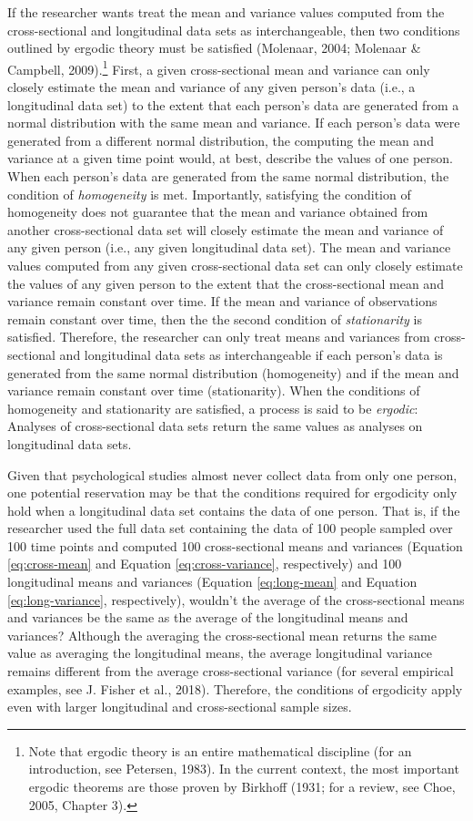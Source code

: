 \documentclass[
12pt, %
twoside,
english]{guelphthesis}
\theoremstyle{definition}
\theoremstyle{definition}
\theoremstyle{definition}
\theoremstyle{definition}
\theoremstyle{remark}
\begin{document}
If the researcher wants treat the mean and variance values computed from the cross-sectional and longitudinal data sets as interchangeable, then two conditions outlined by ergodic theory must be satisfied (Molenaar, 2004; Molenaar \& Campbell, 2009).\footnote{Note that ergodic theory is an entire mathematical discipline (for an introduction, see Petersen, 1983). In the current context, the most important ergodic theorems are those proven by Birkhoff (1931; for a review, see Choe, 2005, Chapter 3).} First, a given cross-sectional mean and variance can only closely estimate the mean and variance of any given person's data (i.e., a longitudinal data set) to the extent that each person's data are generated from a normal distribution with the same mean and variance. If each person's data were generated from a different normal distribution, the computing the mean and variance at a given time point would, at best, describe the values of one person. When each person's data are generated from the same normal distribution, the condition of \emph{homogeneity} is met. Importantly, satisfying the condition of homogeneity does not guarantee that the mean and variance obtained from another cross-sectional data set will closely estimate the mean and variance of any given person (i.e., any given longitudinal data set). The mean and variance values computed from any given cross-sectional data set can only closely estimate the values of any given person to the extent that the cross-sectional mean and variance remain constant over time. If the mean and variance of observations remain constant over time, then the the second condition of \emph{stationarity} is satisfied. Therefore, the researcher can only treat means and variances from cross-sectional and longitudinal data sets as interchangeable if each person's data is generated from the same normal distribution (homogeneity) and if the mean and variance remain constant over time (stationarity). When the conditions of homogeneity and stationarity are satisfied, a process is said to be \emph{ergodic}: Analyses of cross-sectional data sets return the same values as analyses on longitudinal data sets.

Given that psychological studies almost never collect data from only one person, one potential reservation may be that the conditions required for ergodicity only hold when a longitudinal data set contains the data of one person. That is, if the researcher used the full data set containing the data of 100 people sampled over 100 time points and computed 100 cross-sectional means and variances (Equation \ref{eq:cross-mean} and Equation \ref{eq:cross-variance}, respectively) and 100 longitudinal means and variances (Equation \ref{eq:long-mean} and Equation \ref{eq:long-variance}, respectively), wouldn't the average of the cross-sectional means and variances be the same as the average of the longitudinal means and variances? Although the averaging the cross-sectional mean returns the same value as averaging the longitudinal means, the average longitudinal variance remains different from the average cross-sectional variance (for several empirical examples, see J. Fisher et al., 2018). Therefore, the conditions of ergodicity apply even with larger longitudinal and cross-sectional sample sizes.
\end{document}
